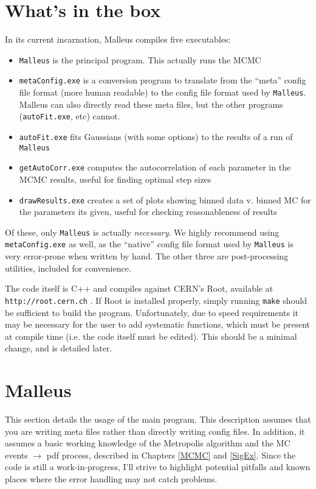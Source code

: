 \section{What's in the box}
In its current incarnation, Malleus compiles five executables:
\begin{itemize}
\item {\tt Malleus} is the principal program.  This actually
  runs the MCMC
\item {\tt metaConfig.exe} is a conversion program to translate from
  the ``meta'' config file format (more human readable) to the config
  file format used by {\tt Malleus}.  Malleus can also directly read
  these meta files, but the other programs ({\tt autoFit.exe}, etc)
  cannot.
\item {\tt autoFit.exe} fits Gaussians (with some options) to the results
  of a run of {\tt Malleus}
\item {\tt getAutoCorr.exe} computes the autocorrelation of each parameter
  in the MCMC results, useful for finding optimal step sizes
\item {\tt drawResults.exe} creates a set of plots showing binned data
  v. binned MC for the parameters its given, useful for checking
  reasonableness of results
\end{itemize}

Of these, only {\tt Malleus} is actually \emph{necessary}.  We
highly recommend using {\tt metaConfig.exe} as well, as the ``native''
config file format used by {\tt Malleus} is very error-prone
when written by hand.  The other three are post-processing utilities,
included for convenience.

The code itself is C++ and compiles against CERN's Root, available at\\
{\tt http://root.cern.ch} \cite{RootBaseSite}.  If Root is installed
properly, simply running {\tt make} should be sufficient to build the
program.  Unfortunately, due to speed requirements it may be necessary
for the user to add systematic functions, which must be present at
compile time (i.e. the code itself must be edited).  This should be a
minimal change, and is detailed later.

\section{Malleus}
This section details the usage of the main program.  This description
assumes that you are writing meta files rather than directly writing
config files.  In addition, it assumes a basic working knowledge of
the Metropolis algorithm and the MC events $\rightarrow$ pdf process,
described in Chapters \ref{MCMC} and \ref{SigEx}.  Since the code is
still a work-in-progress, I'll strive to highlight potential pitfalls
and known places where the error handling may not catch problems.

